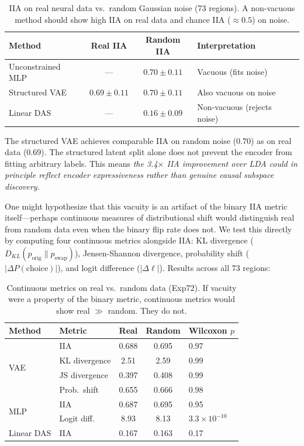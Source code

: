 \documentclass{article}
\begin{document}
\begin{table}[h]
\centering
\small
\caption{IIA on real neural data vs.\ random Gaussian noise (73 regions). A non-vacuous method should show high IIA on real data and chance IIA ($\approx 0.5$) on noise.}
\label{tab:sutter}
\begin{tabular}{lccl}
\toprule
Method & Real IIA & Random IIA & Interpretation \\
\midrule
Unconstrained MLP & --- & $0.70 \pm 0.11$ & Vacuous (fits noise) \\
Structured VAE & $0.69 \pm 0.11$ & $0.70 \pm 0.11$ & Also vacuous on noise \\
Linear DAS & --- & $0.16 \pm 0.09$ & Non-vacuous (rejects noise) \\
\bottomrule
\end{tabular}
\end{table}

The structured VAE achieves comparable IIA on random noise ($0.70$) as on real data ($0.69$). The structured latent split alone does not prevent the encoder from fitting arbitrary labels. This means \emph{the 3.4$\times$ IIA improvement over LDA could in principle reflect encoder expressiveness rather than genuine causal subspace discovery.}

One might hypothesize that this vacuity is an artifact of the binary IIA metric itself---perhaps continuous measures of distributional shift would distinguish real from random data even when the binary flip rate does not. We test this directly by computing four continuous metrics alongside IIA: KL divergence ($D_{KL}(p_{\text{orig}} \| p_{\text{swap}})$), Jensen-Shannon divergence, probability shift ($|\Delta P(\text{choice})|$), and logit difference ($|\Delta \ell|$). Results across all 73 regions:

\begin{table}[h]
\centering
\small
\caption{Continuous metrics on real vs.\ random data (Exp72). If vacuity were a property of the binary metric, continuous metrics would show real $\gg$ random. They do not.}
\label{tab:continuous}
\begin{tabular}{llccl}
\toprule
Method & Metric & Real & Random & Wilcoxon $p$ \\
\midrule
\multirow{4}{*}{VAE} & IIA & 0.688 & 0.695 & 0.97 \\
 & KL divergence & 2.51 & 2.59 & 0.99 \\
 & JS divergence & 0.397 & 0.408 & 0.99 \\
 & Prob.\ shift & 0.655 & 0.666 & 0.98 \\
\midrule
\multirow{2}{*}{MLP} & IIA & 0.687 & 0.695 & 0.95 \\
 & Logit diff.\ & 8.93 & 8.13 & $3.3 \times 10^{-10}$ \\
\midrule
Linear DAS & IIA & 0.167 & 0.163 & 0.17 \\
\bottomrule
\end{tabular}
\end{table}
\end{document}
